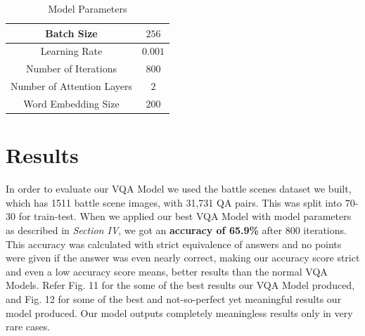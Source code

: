 \documentclass[journal, a4paper]{IEEEtran}
\begin{document}
\begin{table}[!hbt]
		\begin{center}
		\caption{Model Parameters}
		\label{tab:simParameters}
		\begin{tabular}{|c|c|}
			\hline
			Batch Size & $256$ \\
			\hline
			Learning Rate & $0.001$ \\
			\hline
			Number of Iterations & $800$ \\
			\hline
			Number of Attention Layers & $2$\\
			\hline
			Word Embedding Size & $200$\\
			\hline
		\end{tabular}
		\end{center}
	\end{table}
\vspace{-5mm}
\section{Results}
    In order to evaluate our VQA Model we used the battle scenes dataset we built, which has 1511 battle scene images, with 31,731 QA pairs. This was split into 70-30 for train-test. When we applied our best VQA Model with model parameters as described in \textit{Section IV}, we got an \textbf{accuracy of 65.9\%} after 800 iterations. This accuracy was calculated with strict equivalence of answers and no points were given if the answer was even nearly correct, making our accuracy score strict and even a low accuracy score means, better results than the normal VQA Models. Refer Fig. 11 for the some of the best results our VQA Model produced, and Fig. 12 for some of the best and not-so-perfect yet meaningful results our model produced. Our model outputs completely meaningless results only in very rare cases. 
    
\end{document}
